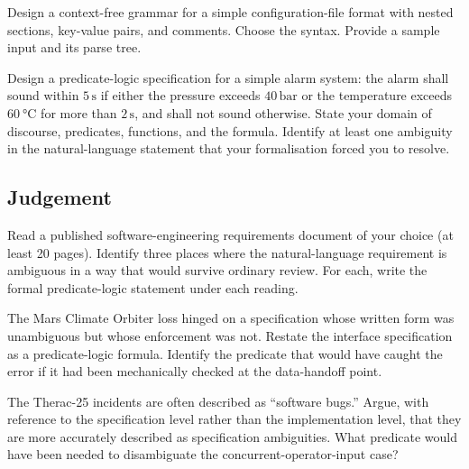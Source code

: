 \begin{exercise}
Design a context-free grammar for a simple configuration-file format with nested sections, key-value pairs, and comments. Choose the syntax. Provide a sample input and its parse tree.
\end{exercise}

\begin{exercise}
Design a predicate-logic specification for a simple alarm system: the alarm shall sound within $5\,\si{\second}$ if either the pressure exceeds $40\,\text{bar}$ or the temperature exceeds $\SI{60}{\degreeCelsius}$ for more than $2\,\si{\second}$, and shall not sound otherwise. State your domain of discourse, predicates, functions, and the formula. Identify at least one ambiguity in the natural-language statement that your formalisation forced you to resolve.
\end{exercise}

\subsection*{Judgement}

\begin{exercise}
Read a published software-engineering requirements document of your choice (at least 20 pages). Identify three places where the natural-language requirement is ambiguous in a way that would survive ordinary review. For each, write the formal predicate-logic statement under each reading.
\end{exercise}

\begin{exercise}
The Mars Climate Orbiter loss \cite{acc:nasa-mco-mib} hinged on a specification whose written form was unambiguous but whose enforcement was not. Restate the interface specification as a predicate-logic formula. Identify the predicate that would have caught the error if it had been mechanically checked at the data-handoff point.
\end{exercise}

\begin{exercise}
The Therac-25 incidents \cite{paper:leveson-turner1993} are often described as ``software bugs.'' Argue, with reference to the specification level rather than the implementation level, that they are more accurately described as specification ambiguities. What predicate would have been needed to disambiguate the concurrent-operator-input case?
\end{exercise}

